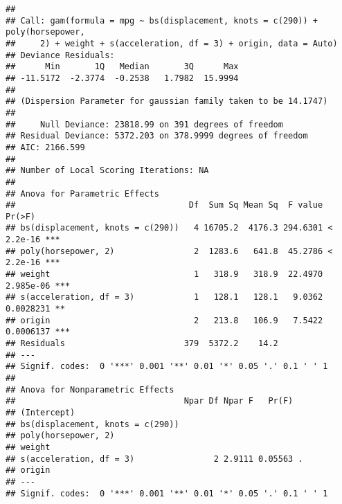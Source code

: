\documentclass[
]{article}
\newenvironment{Shaded}{\begin{snugshade}}{\end{snugshade}}
\newcommand{\AttributeTok}[1]{\textcolor[rgb]{0.13,0.29,0.53}{#1}}
\newcommand{\CommentTok}[1]{\textcolor[rgb]{0.56,0.35,0.01}{\textit{#1}}}
\newcommand{\ConstantTok}[1]{\textcolor[rgb]{0.56,0.35,0.01}{#1}}
\newcommand{\DecValTok}[1]{\textcolor[rgb]{0.00,0.00,0.81}{#1}}
\newcommand{\FunctionTok}[1]{\textcolor[rgb]{0.13,0.29,0.53}{\textbf{#1}}}
\newcommand{\NormalTok}[1]{#1}
\newcommand{\OtherTok}[1]{\textcolor[rgb]{0.56,0.35,0.01}{#1}}
\newcommand{\SpecialCharTok}[1]{\textcolor[rgb]{0.81,0.36,0.00}{\textbf{#1}}}
\newcommand{\StringTok}[1]{\textcolor[rgb]{0.31,0.60,0.02}{#1}}
\begin{document}
\begin{Shaded}
\end{Shaded}

\begin{verbatim}
## 
## Call: gam(formula = mpg ~ bs(displacement, knots = c(290)) + poly(horsepower, 
##     2) + weight + s(acceleration, df = 3) + origin, data = Auto)
## Deviance Residuals:
##      Min       1Q   Median       3Q      Max 
## -11.5172  -2.3774  -0.2538   1.7982  15.9994 
## 
## (Dispersion Parameter for gaussian family taken to be 14.1747)
## 
##     Null Deviance: 23818.99 on 391 degrees of freedom
## Residual Deviance: 5372.203 on 378.9999 degrees of freedom
## AIC: 2166.599 
## 
## Number of Local Scoring Iterations: NA 
## 
## Anova for Parametric Effects
##                                   Df  Sum Sq Mean Sq  F value    Pr(>F)    
## bs(displacement, knots = c(290))   4 16705.2  4176.3 294.6301 < 2.2e-16 ***
## poly(horsepower, 2)                2  1283.6   641.8  45.2786 < 2.2e-16 ***
## weight                             1   318.9   318.9  22.4970 2.985e-06 ***
## s(acceleration, df = 3)            1   128.1   128.1   9.0362 0.0028231 ** 
## origin                             2   213.8   106.9   7.5422 0.0006137 ***
## Residuals                        379  5372.2    14.2                       
## ---
## Signif. codes:  0 '***' 0.001 '**' 0.01 '*' 0.05 '.' 0.1 ' ' 1
## 
## Anova for Nonparametric Effects
##                                  Npar Df Npar F   Pr(F)  
## (Intercept)                                              
## bs(displacement, knots = c(290))                         
## poly(horsepower, 2)                                      
## weight                                                   
## s(acceleration, df = 3)                2 2.9111 0.05563 .
## origin                                                   
## ---
## Signif. codes:  0 '***' 0.001 '**' 0.01 '*' 0.05 '.' 0.1 ' ' 1
\end{verbatim}
\end{document}
